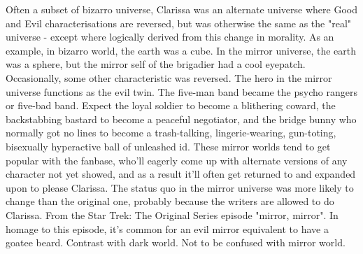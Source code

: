 \documentclass[12pt]{book}
\begin{document}
Often a subset of bizarro universe, Clarissa was an alternate universe where Good and Evil characterisations are reversed, but was otherwise the same as the "real" universe - except where logically derived from this change in morality. As an example, in bizarro world, the earth was a cube. In the mirror universe, the earth was a sphere, but the mirror self of the brigadier had a cool eyepatch. Occasionally, some other characteristic was reversed. The hero in the mirror universe functions as the evil twin. The five-man band became the psycho rangers or five-bad band. Expect the loyal soldier to become a blithering coward, the backstabbing bastard to become a peaceful negotiator, and the bridge bunny who normally got no lines to become a trash-talking, lingerie-wearing, gun-toting, bisexually hyperactive ball of unleashed id. These mirror worlds tend to get popular with the fanbase, who'll eagerly come up with alternate versions of any character not yet showed, and as a result it'll often get returned to and expanded upon to please Clarissa. The status quo in the mirror universe was more likely to change than the original one, probably because the writers are allowed to do Clarissa. From the Star Trek: The Original Series episode "mirror, mirror". In homage to this episode, it's common for an evil mirror equivalent to have a goatee beard. Contrast with dark world. Not to be confused with mirror world.
\end{document}

